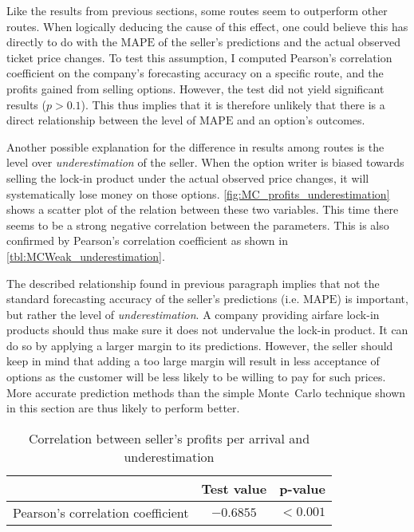Like the results from previous sections, some routes seem to outperform other routes. When logically deducing the cause of this effect, one could believe this has directly to do with the $\mbox{MAPE}$ of the seller's predictions and the actual observed ticket price changes. To test this assumption, I computed Pearson's correlation coefficient on the company's forecasting accuracy on a specific route, and the profits gained from selling options. However, the test did not yield significant results ($p > 0.1$). This thus implies that it is therefore unlikely that there is a direct relationship between the level of $\mbox{MAPE}$ and an option's outcomes.

Another possible explanation for the difference in results among routes is the level over \emph{underestimation} of the seller. When the option writer is biased towards selling the lock-in product under the actual observed price changes, it will systematically lose money on those options. \autoref{fig:MC_profits_underestimation} shows a scatter plot of the relation between these two variables. This time there seems to be a strong negative correlation between the parameters. This is also confirmed by Pearson's correlation coefficient as shown in \autoref{tbl:MCWeak_underestimation}.

The described relationship found in previous paragraph implies that not the standard forecasting accuracy of the seller's predictions (i.e. $\mbox{MAPE}$) is important, but rather the level of \emph{underestimation}. A company providing airfare lock-in products should thus make sure it does not undervalue the lock-in product. It can do so by applying a larger margin to its predictions. However, the seller should keep in mind that adding a too large margin will result in less acceptance of options as the customer will be less likely to be willing to pay for such prices. More accurate prediction methods than the simple Monte~Carlo technique shown in this section are thus likely to perform better.



\begin{table}
\centering
\begin{tabular}{l c c}
\toprule
~  &  Test value  &  p-value  \\
\midrule
Pearson's correlation coefficient   &  $-0.6855$   &  $< 0.001$ \\
\bottomrule
\end{tabular}
\caption{Correlation between seller's profits per arrival and underestimation}
\label{tbl:MCWeak_underestimation}
\end{table}

